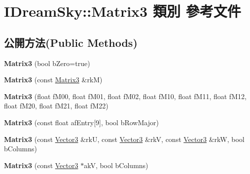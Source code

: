 \hypertarget{class_i_dream_sky_1_1_matrix3}{}\section{I\+Dream\+Sky\+:\+:Matrix3 類別 參考文件}
\label{class_i_dream_sky_1_1_matrix3}
\subsection*{公開方法(Public Methods)}
\begin{DoxyCompactItemize}
\item 
{\bfseries Matrix3} (bool b\+Zero=true)\hypertarget{class_i_dream_sky_1_1_matrix3_a05e53883bf9ea3c96c65ae5149c145e1}{}\label{class_i_dream_sky_1_1_matrix3_a05e53883bf9ea3c96c65ae5149c145e1}

\item 
{\bfseries Matrix3} (const \hyperlink{class_i_dream_sky_1_1_matrix3}{Matrix3} \&rkM)\hypertarget{class_i_dream_sky_1_1_matrix3_a7f48dbe3cc999ccbe2ff178bd1594e45}{}\label{class_i_dream_sky_1_1_matrix3_a7f48dbe3cc999ccbe2ff178bd1594e45}

\item 
{\bfseries Matrix3} (float f\+M00, float f\+M01, float f\+M02, float f\+M10, float f\+M11, float f\+M12, float f\+M20, float f\+M21, float f\+M22)\hypertarget{class_i_dream_sky_1_1_matrix3_a5bb862f7e2e0cd6e9bd8c8333d51c176}{}\label{class_i_dream_sky_1_1_matrix3_a5bb862f7e2e0cd6e9bd8c8333d51c176}

\item 
{\bfseries Matrix3} (const float af\+Entry\mbox{[}9\mbox{]}, bool b\+Row\+Major)\hypertarget{class_i_dream_sky_1_1_matrix3_adda28c5a66f34265b327e628183882bb}{}\label{class_i_dream_sky_1_1_matrix3_adda28c5a66f34265b327e628183882bb}

\item 
{\bfseries Matrix3} (const \hyperlink{class_i_dream_sky_1_1_vector3}{Vector3} \&rkU, const \hyperlink{class_i_dream_sky_1_1_vector3}{Vector3} \&rkV, const \hyperlink{class_i_dream_sky_1_1_vector3}{Vector3} \&rkW, bool b\+Columns)\hypertarget{class_i_dream_sky_1_1_matrix3_abc666cd3750a8b356212ebe39aab6044}{}\label{class_i_dream_sky_1_1_matrix3_abc666cd3750a8b356212ebe39aab6044}

\item 
{\bfseries Matrix3} (const \hyperlink{class_i_dream_sky_1_1_vector3}{Vector3} $\ast$akV, bool b\+Columns)\hypertarget{class_i_dream_sky_1_1_matrix3_a81da03ae95e0bff06b9937c6248ac71b}{}\label{class_i_dream_sky_1_1_matrix3_a81da03ae95e0bff06b9937c6248ac71b}


\end{DoxyCompactItemize}

